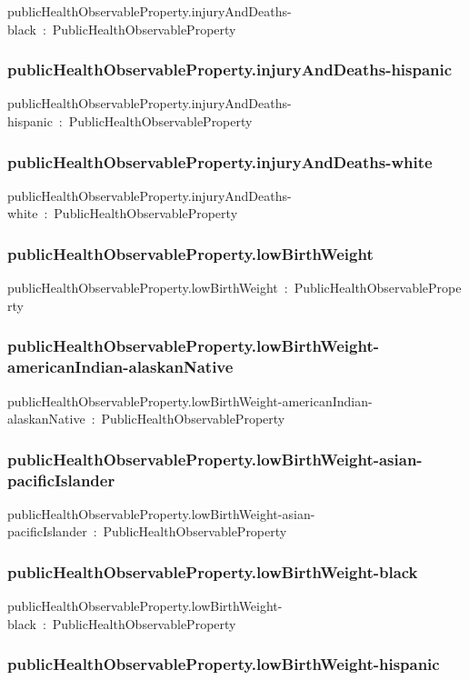 \documentclass{article}
\begin{document}
publicHealthObservableProperty.injuryAndDeaths-black~:~PublicHealthObservableProperty

\subsubsection*{publicHealthObservableProperty.injuryAndDeaths-hispanic}

publicHealthObservableProperty.injuryAndDeaths-hispanic~:~PublicHealthObservableProperty

\subsubsection*{publicHealthObservableProperty.injuryAndDeaths-white}

publicHealthObservableProperty.injuryAndDeaths-white~:~PublicHealthObservableProperty

\subsubsection*{publicHealthObservableProperty.lowBirthWeight}

publicHealthObservableProperty.lowBirthWeight~:~PublicHealthObservableProperty

\subsubsection*{publicHealthObservableProperty.lowBirthWeight-americanIndian-alaskanNative}

publicHealthObservableProperty.lowBirthWeight-americanIndian-alaskanNative~:~PublicHealthObservableProperty

\subsubsection*{publicHealthObservableProperty.lowBirthWeight-asian-pacificIslander}

publicHealthObservableProperty.lowBirthWeight-asian-pacificIslander~:~PublicHealthObservableProperty

\subsubsection*{publicHealthObservableProperty.lowBirthWeight-black}

publicHealthObservableProperty.lowBirthWeight-black~:~PublicHealthObservableProperty

\subsubsection*{publicHealthObservableProperty.lowBirthWeight-hispanic}
\end{document}
